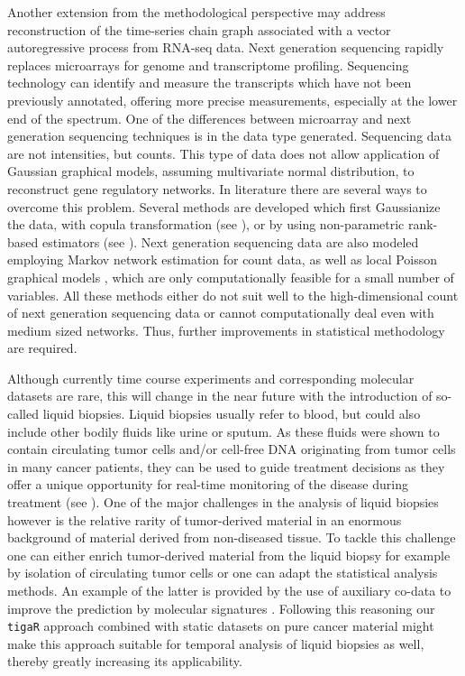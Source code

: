 Another extension from the methodological perspective may address reconstruction of the time-series chain graph associated with a vector autoregressive process from RNA-seq data. Next generation sequencing rapidly replaces microarrays for genome and transcriptome profiling. Sequencing technology can identify and measure the transcripts which have not been previously annotated, offering more precise measurements, especially at the lower end of the spectrum. One of the differences between microarray and next generation sequencing techniques is in the data type generated. Sequencing data are not intensities, but counts. This type of data does not allow application of Gaussian graphical models, assuming multivariate normal distribution, to reconstruct gene regulatory networks. In literature there are several ways to overcome this problem. Several methods are developed which first Gaussianize the data, with copula transformation (see \cite{Liu2009, Dobra2011}), or by using non-parametric rank-based estimators (see \cite{Liu2012}). Next generation sequencing data are also modeled employing Markov network estimation for count data, as well as local Poisson graphical models \cite{Allen2013}, which are only computationally feasible for a small number of variables. All these methods either do not suit well to the high-dimensional count of next generation sequencing data or cannot computationally deal even with medium sized networks. Thus, further improvements in statistical methodology are required.

Although currently time course experiments and corresponding molecular datasets are rare, this will change in the near future with the introduction of so-called liquid biopsies. Liquid biopsies usually refer to blood, but could also include other bodily fluids like urine or sputum. As these fluids were shown to contain circulating tumor cells and/or cell-free DNA originating from tumor cells in many cancer patients, they can be used to guide treatment decisions as they offer a unique opportunity for real-time monitoring of the disease during treatment (see \cite{Alix2013}). 
One of the major challenges in the analysis of liquid biopsies however is the relative rarity of tumor-derived material in an enormous background of material derived from non-diseased tissue. To tackle this challenge one can either enrich tumor-derived material from the liquid biopsy for example by isolation of circulating tumor cells or one can adapt the statistical analysis methods. An example of the latter is provided by the use of auxiliary co-data to improve the prediction by molecular signatures \cite{Novianti2017}. Following this reasoning our {\tt tigaR} approach combined with static datasets on pure cancer material might make this approach suitable for temporal analysis of liquid biopsies as well, thereby greatly increasing its applicability.

